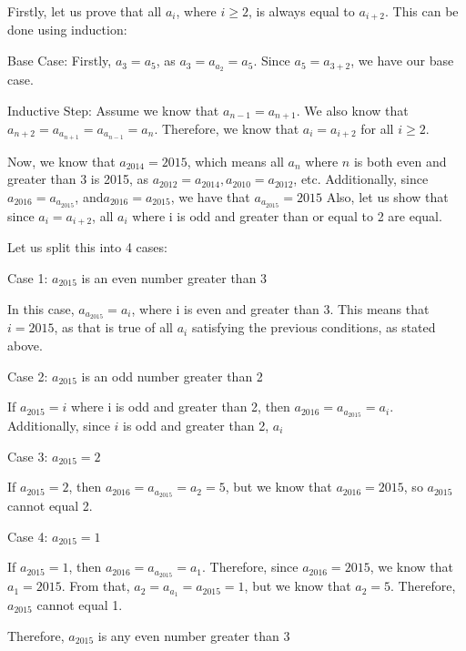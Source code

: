 \documentclass[11pt]{article}
\begin{document}
\begin{solution}{5}
Firstly, let us prove that all $a_i$, where $i\geq2$, is always equal to $a_{i+2}$. This can be done using induction:

Base Case: Firstly, $a_3 = a_5$, as $a_3 = a_{a_2} = a_5$. Since $a_5 = a_{3+2}$, we have our base case.

Inductive Step:
Assume we know that $a_{n-1} = a_{n+1}$. We also know that $a_{n+2} = a_{a_{n+1}} = a_{a_{n-1}} = a_n$.
Therefore, we know that $a_i = a_{i+2}$ for all $i\geq2$.

Now, we know that $a_{2014} = 2015$, which means all $a_n$ where $n$ is both even and greater than 3 is 2015, as $a_{2012} = a_{2014}, a_{2010} = a_{2012}$, etc. 
Additionally, since $a_{2016} = a_{a_{2015}}$, and$ a_{2016} = a_{2015}$, we have that $a_{a_{2015}} = 2015$
Also, let us show that since $a_i = a_{i+2}$, all $a_i$ where i is odd and greater than or equal to 2 are equal.

Let us split this into 4 cases:

Case 1: $a_{2015}$ is an even number greater than 3

In this case, $a_{a_{2015}} = a_i$, where i is even and greater than 3. This means that $i=2015$, as that is true of all $a_i$ satisfying the previous conditions, as stated above.

Case 2: $a_{2015}$ is an odd number greater than 2

If $a_{2015} = i$ where i is odd and greater than 2, then $a_{2016} = a_{a_{2015}} = a_i$. Additionally, since $i$ is odd and greater than 2, $a_i$

Case 3: $a_{2015} = 2$

If $a_{2015} = 2$, then $a_{2016} = a_{a_{2015}} = a_2 = 5$, but we know that $a_{2016} = 2015$, so $a_{2015}$ cannot equal 2.

Case 4: $a_{2015} = 1$

If $a_{2015} = 1$, then $a_{2016} = a_{a_{2015}} = a_1$. Therefore, since $a_{2016} = 2015$, we know that $a_1 = 2015$.
From that, $a_2 = a_{a_1} = a_{2015} = 1$, but we know that $a_2 = 5$. Therefore, $a_{2015}$ cannot equal 1. 

Therefore, $a_{2015}$ is any even number greater than 3

\end{solution}

\end{document}
